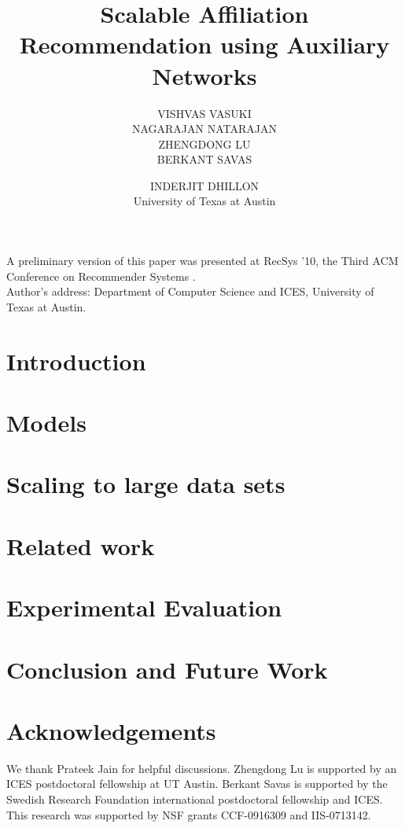 \documentclass[acmtist]{acmtrans2m}
\title{Scalable Affiliation Recommendation using Auxiliary Networks}
\author{
VISHVAS VASUKI \\ NAGARAJAN NATARAJAN \\ ZHENGDONG LU \\ BERKANT SAVAS \and INDERJIT DHILLON\\ University of Texas at Austin
}
\begin{document}
\setcounter{page}{111}

\begin{bottomstuff}
A preliminary version of this paper was presented at RecSys '10, the Third ACM Conference on Recommender Systems \cite{vasukiNatarajan}.\\
Author's address: Department of Computer Science and ICES, University of Texas at Austin.
\end{bottomstuff}
\maketitle

\section{Introduction}
\label{Introduction}


\section{Models}
\label{Models}


\section{Scaling to large data sets}
\label{Scalability}


\section{Related work}
\label{Related work}


\section{Experimental Evaluation}
\label{Experimental Evaluation}


\section{Conclusion and Future Work}
\label{Conclusion and Future Work}


\section{Acknowledgements}
We thank Prateek Jain for helpful discussions. Zhengdong Lu is supported by an ICES postdoctoral fellowship at UT Austin. 
Berkant Savas is supported by the Swedish Research Foundation international postdoctoral fellowship and ICES.
This research was supported by NSF grants CCF-0916309 and IIS-0713142.



\end{document}
